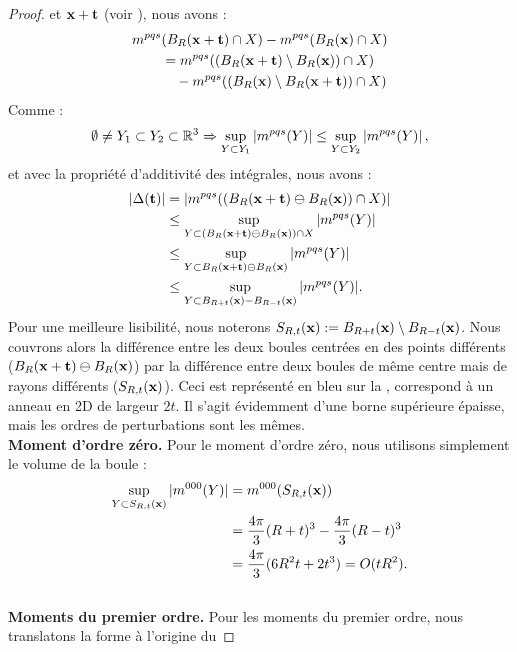 \begin{proof}
et $\mathbf{x} + \mathbf{t}$ (voir ), nous avons :
%
\begin{align}
  m^{pqs}&(B_{R}(\mathbf{x}+\mathbf{t}) \cap X ) - m^{pqs}(B_{R}(\mathbf{x}) \cap X ) \\
    &= m^{pqs}( (B_{R}(\mathbf{x}+\mathbf{t}) \setminus B_{R}(\mathbf{x})) \cap X ) \\
    & \quad - m^{pqs}( (B_{R}(\mathbf{x}) \setminus B_{R}(\mathbf{x}+\mathbf{t})) \cap X )
\end{align}
%
Comme :
%
\begin{equation}
  \emptyset \neq Y_1 \subset Y_2 \subset \mathbb{R}^3 \Rightarrow \sup_{ Y \subset Y_1} \left | m^{pqs}(Y) \right| \le \sup_{Y \subset Y_2} \left| m^{pqs}(Y)\right |,
\end{equation}
%
et avec la propriété d'additivité des intégrales, nous avons :
%
\begin{align}
  |\Delta(\mathbf{t})| &= |m^{pqs}( (B_{R}(\mathbf{x}+\mathbf{t}) \ominus B_{R}(\mathbf{x})) \cap X )| \\
  &\le \sup_{Y \subset (B_{R}(\mathbf{x}+\mathbf{t}) \ominus B_{R}(\mathbf{x})) \cap X} |m^{pqs}(Y)|\\
  &\le \sup_{Y \subset B_{R}(\mathbf{x}+\mathbf{t}) \ominus B_{R}(\mathbf{x})} |m^{pqs}(Y)|\\
  &\le \sup_{Y \subset B_{R+t}(\mathbf{x}) - B_{R-t}(\mathbf{x})} |m^{pqs}(Y)|.
\end{align}
%
Pour une meilleure lisibilité, nous noterons $S_{R,t}(\mathbf{x}) :=
B_{R+t}(\mathbf{x}) \setminus B_{R-t}(\mathbf{x})$. Nous couvrons alors la différence
entre les deux boules centrées en des points différents ($B_{R}(\mathbf{x}+\mathbf{t})
\ominus B_{R}(\mathbf{x})$) par la différence entre deux boules de même centre mais
de rayons différents ($S_{R,t}(\mathbf{x})$). Ceci est représenté
en bleu sur la , correspond à un anneau en 2D de
largeur $2t$. Il s'agit évidemment d'une borne supérieure épaisse, mais les
ordres de perturbations sont les mêmes.
%
\textbf{\\Moment d'ordre zéro.\quad}
%
Pour le moment d'ordre zéro, nous utilisons simplement le volume de la boule :
%
\begin{align}
  \sup_{Y \subset S_{R,t}(\mathbf{x})} |m^{000}(Y)|
  &= m^{000}( S_{R,t}(\mathbf{x}) ) \\
  &= \frac{4\pi}{3}(R+t)^3 - \frac{4\pi}{3}(R-t)^3 \\
  &= \frac{4\pi}{3}(6R^2t+2t^3)=O(tR^2).
\end{align}
%
\textbf{\\Moments du premier ordre.\quad}
%
Pour les moments du premier ordre, nous translatons la forme à l'origine du

\end{proof}
